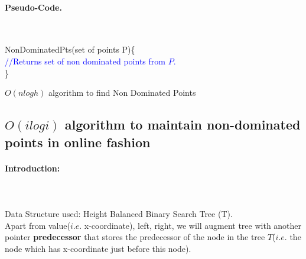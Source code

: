 \documentclass[pdftex,a4paper,12pt]{report}
\begin{document}
\paragraph{Pseudo-Code.} \mbox{} \\
\begin{algorithm}

NonDominatedPts(set of points P)\{\\
\makebox[40pt]{}\textcolor{blue}{//Returns set of non dominated points from $P$.}\\
\}
\caption{\textbf{$O(n logh)$} algorithm to find Non Dominated Points}
\end{algorithm}
\newpage

\subsection{\textbf{$O(i logi)$} algorithm to maintain non-dominated points in online fashion}

\paragraph{Introduction:} \makebox[2pt]{}\\\\
Data Structure used: Height Balanced Binary Search Tree (T).\\
Apart from value($i.e.$ x-coordinate), left, right, we will augment tree with another pointer \textbf{predecessor}
that stores the predecessor of the node in the tree $T$($i.e.$ the node which has x-coordinate just before this node).
\end{document}

